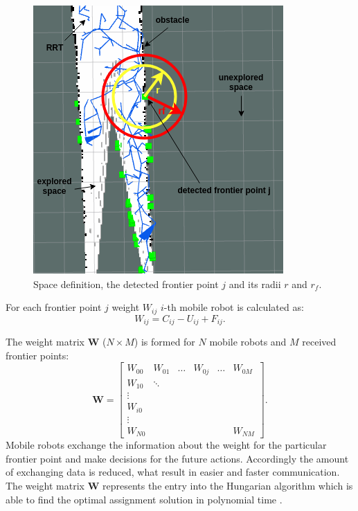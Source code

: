\documentclass[letterpaper, 10 pt, conference]{ieeeconf}  %
\begin{document}
\begin{figure}[h!]
	\centering\includegraphics[width=0.8\columnwidth]{radius-and-space.png}
	\caption{Space definition, the detected frontier point $j$ and its radii $r$ and $r_{f}$.}
	\label{fig:radijusi}
\end{figure}

For each frontier point $j$ weight $W_{ij}$ $i$-th mobile robot is calculated as: 
\begin{equation}
   {W}_{ij}= {C_{ij}} - {U_{ij}} + {F_{ij}}.
   \label{weight}
\end{equation}

The weight matrix $\boldsymbol{W}$ ($N\times M$) is formed for $N$ mobile robots and $M$ received frontier points: 
\begin{equation}
    \boldsymbol{W} = \begin{bmatrix}
    W_{00} & W_{01} & \hdots & W_{0j} & \hdots & W_{0M}\\
    W_{10} & \ddots \\
    \vdots  \\
    W_{i0} \\
    \vdots \\
    W_{N0} &        &     &     &        &    W_{NM}
    \end{bmatrix}.
\end{equation}
Mobile robots exchange the information about the weight for the particular frontier point and make decisions for the future actions. Accordingly the amount of exchanging data is reduced, what result in easier and faster communication.
The weight matrix $\boldsymbol{W}$ represents the entry into the Hungarian algorithm which is able to find the optimal assignment solution in polynomial time \cite{hungarian}. 
\end{document}
